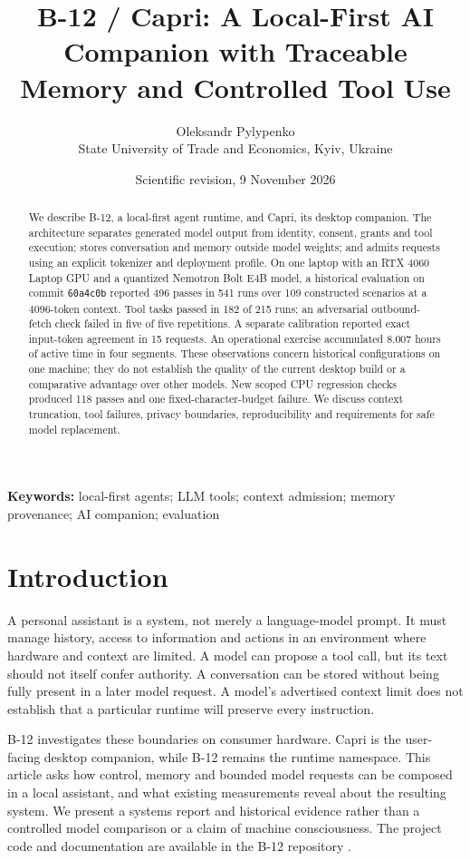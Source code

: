 \documentclass[11pt]{article}
\title{B-12 / Capri: A Local-First AI Companion with Traceable Memory and Controlled Tool Use}
\author{Oleksandr Pylypenko\\State University of Trade and Economics, Kyiv, Ukraine}
\date{Scientific revision, 9 November 2026}
\begin{document}
\sloppy
\maketitle
\begin{abstract}
We describe B-12, a local-first agent runtime, and Capri, its desktop companion. The architecture separates generated model output from identity, consent, grants and tool execution; stores conversation and memory outside model weights; and admits requests using an explicit tokenizer and deployment profile. On one laptop with an RTX 4060 Laptop GPU and a quantized Nemotron Bolt E4B model, a historical evaluation on commit \texttt{60a4c0b} reported 496 passes in 541 runs over 109 constructed scenarios at a 4096-token context. Tool tasks passed in 182 of 215 runs; an adversarial outbound-fetch check failed in five of five repetitions. A separate calibration reported exact input-token agreement in 15 requests. An operational exercise accumulated 8.007 hours of active time in four segments. These observations concern historical configurations on one machine; they do not establish the quality of the current desktop build or a comparative advantage over other models. New scoped CPU regression checks produced 118 passes and one fixed-character-budget failure. We discuss context truncation, tool failures, privacy boundaries, reproducibility and requirements for safe model replacement.
\end{abstract}
\noindent\textbf{Keywords:} local-first agents; LLM tools; context admission; memory provenance; AI companion; evaluation

\section{Introduction}
A personal assistant is a system, not merely a language-model prompt. It must manage history, access to information and actions in an environment where hardware and context are limited. A model can propose a tool call, but its text should not itself confer authority. A conversation can be stored without being fully present in a later model request. A model's advertised context limit does not establish that a particular runtime will preserve every instruction.

B-12 investigates these boundaries on consumer hardware. Capri is the user-facing desktop companion, while B-12 remains the runtime namespace. This article asks how control, memory and bounded model requests can be composed in a local assistant, and what existing measurements reveal about the resulting system. We present a systems report and historical evidence rather than a controlled model comparison or a claim of machine consciousness. The project code and documentation are available in the B-12 repository \cite{b12}.
\end{document}
